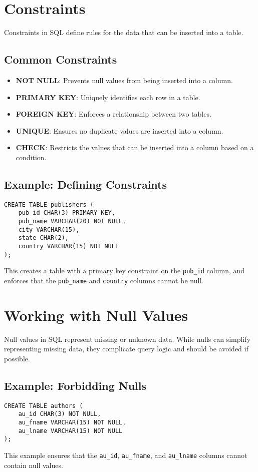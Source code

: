\documentclass{article}
\begin{document}
\section{Constraints}
Constraints in SQL define rules for the data that can be inserted into a table.

\subsection{Common Constraints}
\begin{itemize}
    \item \textbf{NOT NULL}: Prevents null values from being inserted into a column.
    \item \textbf{PRIMARY KEY}: Uniquely identifies each row in a table.
    \item \textbf{FOREIGN KEY}: Enforces a relationship between two tables.
    \item \textbf{UNIQUE}: Ensures no duplicate values are inserted into a column.
    \item \textbf{CHECK}: Restricts the values that can be inserted into a column based on a condition.
\end{itemize}

\subsection{Example: Defining Constraints}
\begin{verbatim}
CREATE TABLE publishers (
    pub_id CHAR(3) PRIMARY KEY,
    pub_name VARCHAR(20) NOT NULL,
    city VARCHAR(15),
    state CHAR(2),
    country VARCHAR(15) NOT NULL
);
\end{verbatim}
This creates a table with a primary key constraint on the \texttt{pub\_id} column, and enforces that the \texttt{pub\_name} and \texttt{country} columns cannot be null.

\section{Working with Null Values}
Null values in SQL represent missing or unknown data. While nulls can simplify representing missing data, they complicate query logic and should be avoided if possible.

\subsection{Example: Forbidding Nulls}
\begin{verbatim}
CREATE TABLE authors (
    au_id CHAR(3) NOT NULL,
    au_fname VARCHAR(15) NOT NULL,
    au_lname VARCHAR(15) NOT NULL
);
\end{verbatim}
This example ensures that the \texttt{au\_id}, \texttt{au\_fname}, and \texttt{au\_lname} columns cannot contain null values.
\end{document}

